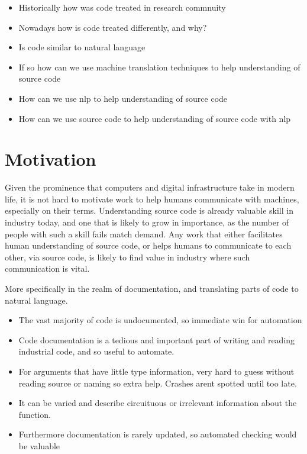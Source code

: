 \begin{itemize}
    \item Historically how was code treated in research commnuity
    \item Nowadays how is code treated differently, and why?
    \item Is code similar to natural language
    \item If so how can we use machine translation techniques to help understanding of source code
    \item How can we use nlp to help understanding of source code
    \item How can we use source code to help understanding of source code with nlp
\end{itemize}



\section{Motivation} %
\label{sec:motivation}

Given the prominence that computers and digital infrastructure take in modern life, it is not hard to motivate work to help humans communicate with machines, especially on their terms.
Understanding source code is already valuable skill in industry today, and one that is likely to grow in importance, as the number of people with such a skill fails match demand. 
Any work that either facilitates human understanding of source code, or helps humans to communicate to each other, via source code, is likely to find value in industry where such communication is vital.

More specifically in the realm of documentation, and translating parts of code to natural language.

\begin{itemize}
    \item The vast majority of code is undocumented, so immediate win for automation
    \item Code documentation is a tedious and important part of writing and reading industrial code, and so useful to automate.
    \item For arguments that have little type information, very hard to guess without reading source or naming so extra help. Crashes arent spotted until too late.
    \item It can be varied and describe circuituous or irrelevant information about the function.
    \item Furthermore documentation is rarely updated, so automated checking would be valuable
\end{itemize}

